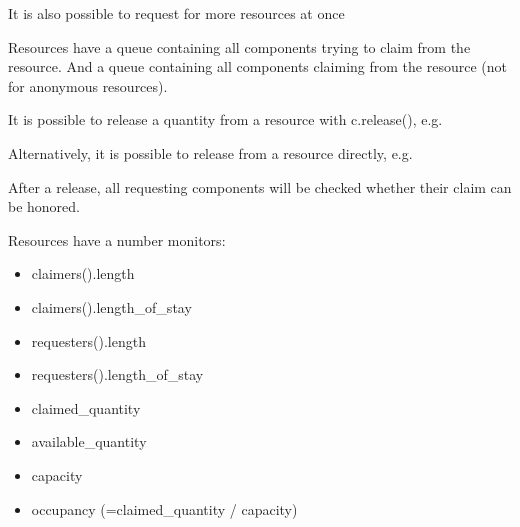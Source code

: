 \documentclass[letterpaper,10pt,english]{sphinxmanual}
\begin{document}
It is also possible to request for more resources at once

\begin{sphinxVerbatim}[commandchars=\\\{\}]
   
\end{sphinxVerbatim}

Resources have a queue  containing all components trying to claim from the resource.
And a queue  containing all components claiming from the resource
(not for anonymous resources).

It is possible to release a quantity from a resource with c.release(), e.g.

\begin{sphinxVerbatim}[commandchars=\\\{\}]
  
  
\end{sphinxVerbatim}

Alternatively, it is possible to release from a resource directly, e.g.

\begin{sphinxVerbatim}[commandchars=\\\{\}]
  
  
\end{sphinxVerbatim}

After a release, all requesting components will be checked whether their claim can be honored.

Resources have a number monitors:
\begin{itemize}
\item {} 
claimers().length

\item {} 
claimers().length\_of\_stay

\item {} 
requesters().length

\item {} 
requesters().length\_of\_stay

\item {} 
claimed\_quantity

\item {} 
available\_quantity

\item {} 
capacity

\item {} 
occupancy  (=claimed\_quantity / capacity)

\end{itemize}
\end{document}
